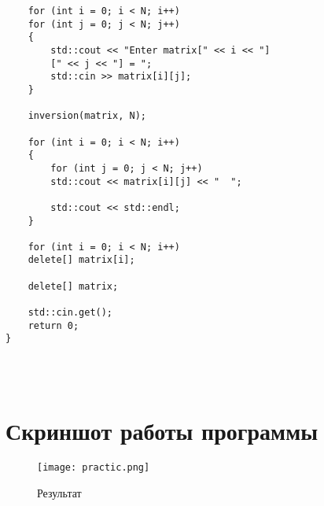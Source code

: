 \documentclass[12pt,a4paper]{scrartcl}
\begin{document}
\begin{verbatim}
	for (int i = 0; i < N; i++)
	for (int j = 0; j < N; j++)
	{
		std::cout << "Enter matrix[" << i << "]
		[" << j << "] = ";
		std::cin >> matrix[i][j];
	}
	
	inversion(matrix, N);
	
	for (int i = 0; i < N; i++)
	{
		for (int j = 0; j < N; j++)
		std::cout << matrix[i][j] << "  ";
		
		std::cout << std::endl;
	}
	
	for (int i = 0; i < N; i++)
	delete[] matrix[i];
	
	delete[] matrix;
	
	std::cin.get();
	return 0;
}
	
	
	
\end{verbatim}
\vfill


\section{Скриншот работы программы}
\label{sec:picexample}
\begin{figure}[h]
	\centering
	\texttt{[image: practic.png]}
	\caption{Результат}\label{fig:par}
\end{figure}
\end{document}
